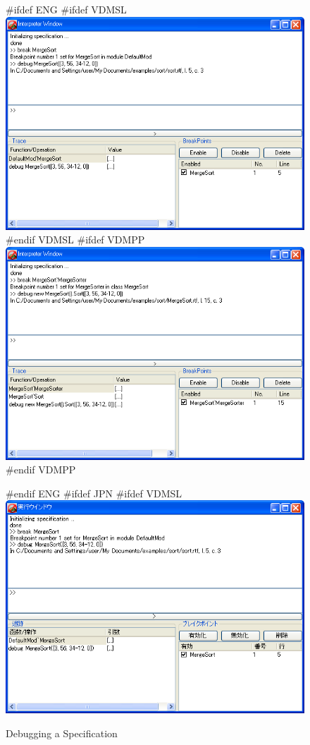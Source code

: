 \documentclass[\pformat,12pt]{article}
\begin{document}
\begin{figure}[tbh]
\begin{center}
#ifdef ENG
#ifdef VDMSL
\includegraphics[width=\textwidth]{debugging-slENG.png}
#endif VDMSL
#ifdef VDMPP
\includegraphics[width=15cm]{debugging-ppENG.png}
#endif VDMPP
\caption{Debugging a Specification}
#endif ENG
#ifdef JPN
#ifdef VDMSL
\includegraphics[width=\textwidth]{debugging-sl.png}

\end{center}
\end{figure}
\end{document}
